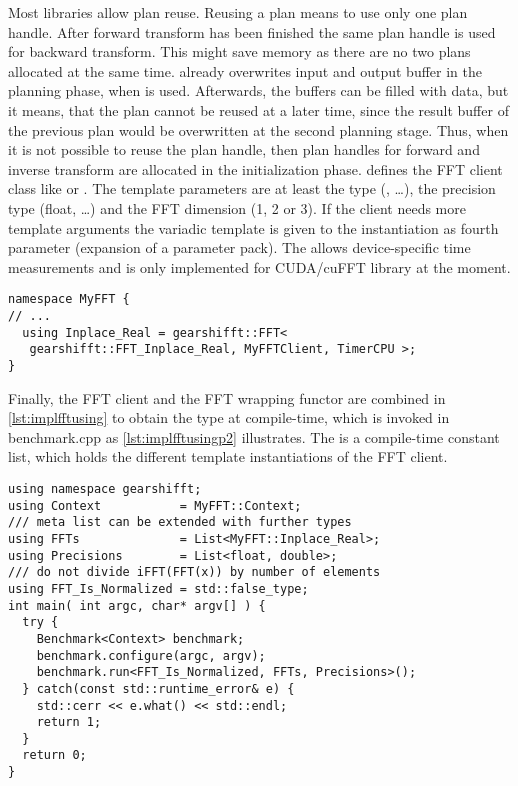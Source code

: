Most libraries allow plan reuse.
Reusing a plan means to use only one plan handle. After forward transform has been finished the same plan handle is used for backward transform.
This might save memory as there are no two plans allocated at the same time. \fftw{} already overwrites input and output buffer in the planning phase, when  is used. Afterwards, the buffers can be filled with data, but it means, that the plan cannot be reused at a later time, since the result buffer of the previous plan would be overwritten at the second planning stage.
Thus, when it is not possible to reuse the plan handle, then plan handles for forward and inverse transform are allocated in the initialization phase.
%
 defines the FFT client class like  or .
The template parameters are at least the  type (, \ldots), the precision type (float, \ldots) and the FFT dimension (1, 2 or 3). 
If the client needs more template arguments the variadic template  is given to the  instantiation as fourth parameter (expansion of a parameter pack).
The  allows device-specific time measurements and is only implemented for CUDA/cuFFT library at the moment.

\begin{lstlisting}[caption={Define FFT client types for corresponding FFTs},label={lst:implfftusing}]
namespace MyFFT { 
// ...
  using Inplace_Real = gearshifft::FFT<
   gearshifft::FFT_Inplace_Real, MyFFTClient, TimerCPU >;
}
\end{lstlisting}

Finally, the FFT client and the FFT wrapping functor are combined in \cref{lst:implfftusing} to obtain the type at compile-time, which is invoked in benchmark.cpp as \cref{lst:implfftusingp2} illustrates. The  is a compile-time constant list, which holds the different template instantiations of the FFT client. 

\begin{lstlisting}[caption={Using FFT client types to run the benchmarks},label={lst:implfftusingp2}]
using namespace gearshifft;
using Context           = MyFFT::Context;         
/// meta list can be extended with further types
using FFTs              = List<MyFFT::Inplace_Real>;
using Precisions        = List<float, double>;   
/// do not divide iFFT(FFT(x)) by number of elements
using FFT_Is_Normalized = std::false_type;
int main( int argc, char* argv[] ) {                                                        
  try {                                                  
    Benchmark<Context> benchmark;
    benchmark.configure(argc, argv);                     
    benchmark.run<FFT_Is_Normalized, FFTs, Precisions>();
  } catch(const std::runtime_error& e) {
    std::cerr << e.what() << std::endl;                  
    return 1;                                            
  }                                                      
  return 0;
}                                                        
\end{lstlisting}

